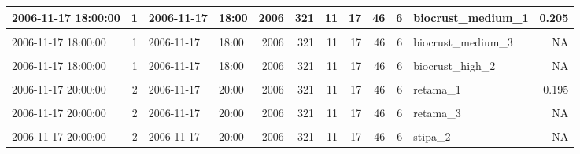 \documentclass[]{article}
\begin{document}
\begin{table}[H]
{\begin{tabular}[t]{l|r|l|l|r|r|r|r|r|r|l|r}
\hline
2006-11-17 18:00:00 & 1 & 2006-11-17 & 18:00 & 2006 & 321 & 11 & 17 & 46 & 6 & biocrust\_medium\_1 & 0.205\\
\hline
\cellcolor{gray!6}{2006-11-17 18:00:00} & \cellcolor{gray!6}{1} & \cellcolor{gray!6}{2006-11-17} & \cellcolor{gray!6}{18:00} & \cellcolor{gray!6}{2006} & \cellcolor{gray!6}{321} & \cellcolor{gray!6}{11} & \cellcolor{gray!6}{17} & \cellcolor{gray!6}{46} & \cellcolor{gray!6}{6} & \cellcolor{gray!6}{biocrust\_medium\_2} & \cellcolor{gray!6}{NA}\\
\hline
2006-11-17 18:00:00 & 1 & 2006-11-17 & 18:00 & 2006 & 321 & 11 & 17 & 46 & 6 & biocrust\_medium\_3 & NA\\
\hline
\cellcolor{gray!6}{2006-11-17 18:00:00} & \cellcolor{gray!6}{1} & \cellcolor{gray!6}{2006-11-17} & \cellcolor{gray!6}{18:00} & \cellcolor{gray!6}{2006} & \cellcolor{gray!6}{321} & \cellcolor{gray!6}{11} & \cellcolor{gray!6}{17} & \cellcolor{gray!6}{46} & \cellcolor{gray!6}{6} & \cellcolor{gray!6}{biocrust\_high\_1} & \cellcolor{gray!6}{0.121}\\
\hline
2006-11-17 18:00:00 & 1 & 2006-11-17 & 18:00 & 2006 & 321 & 11 & 17 & 46 & 6 & biocrust\_high\_2 & NA\\
\hline
\cellcolor{gray!6}{2006-11-17 18:00:00} & \cellcolor{gray!6}{1} & \cellcolor{gray!6}{2006-11-17} & \cellcolor{gray!6}{18:00} & \cellcolor{gray!6}{2006} & \cellcolor{gray!6}{321} & \cellcolor{gray!6}{11} & \cellcolor{gray!6}{17} & \cellcolor{gray!6}{46} & \cellcolor{gray!6}{6} & \cellcolor{gray!6}{biocrust\_high\_3} & \cellcolor{gray!6}{NA}\\
\hline
2006-11-17 20:00:00 & 2 & 2006-11-17 & 20:00 & 2006 & 321 & 11 & 17 & 46 & 6 & retama\_1 & 0.195\\
\hline
\cellcolor{gray!6}{2006-11-17 20:00:00} & \cellcolor{gray!6}{2} & \cellcolor{gray!6}{2006-11-17} & \cellcolor{gray!6}{20:00} & \cellcolor{gray!6}{2006} & \cellcolor{gray!6}{321} & \cellcolor{gray!6}{11} & \cellcolor{gray!6}{17} & \cellcolor{gray!6}{46} & \cellcolor{gray!6}{6} & \cellcolor{gray!6}{retama\_2} & \cellcolor{gray!6}{NA}\\
\hline
2006-11-17 20:00:00 & 2 & 2006-11-17 & 20:00 & 2006 & 321 & 11 & 17 & 46 & 6 & retama\_3 & NA\\
\hline
\cellcolor{gray!6}{2006-11-17 20:00:00} & \cellcolor{gray!6}{2} & \cellcolor{gray!6}{2006-11-17} & \cellcolor{gray!6}{20:00} & \cellcolor{gray!6}{2006} & \cellcolor{gray!6}{321} & \cellcolor{gray!6}{11} & \cellcolor{gray!6}{17} & \cellcolor{gray!6}{46} & \cellcolor{gray!6}{6} & \cellcolor{gray!6}{stipa\_1} & \cellcolor{gray!6}{0.131}\\
\hline
2006-11-17 20:00:00 & 2 & 2006-11-17 & 20:00 & 2006 & 321 & 11 & 17 & 46 & 6 & stipa\_2 & NA\\
\hline
\end{tabular}}
\end{table}
\end{document}
